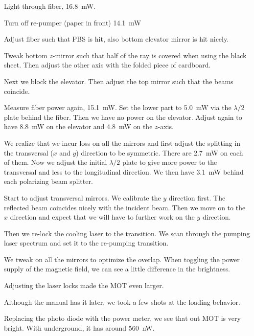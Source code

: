 \documentclass[11pt, english, fleqn, DIV=15, headinclude, BCOR=2cm]{scrreprt}
\begin{document}
Light through fiber, \SI{16.8}{\milli\watt}.

Turn off re-pumper (paper in front) \SI{14.1}{\milli\watt}

Adjust fiber such that PBS is hit, also bottom elevator mirror is hit nicely.

Tweak bottom $z$-mirror such that half of the ray is covered when using the
black sheet. Then adjust the other axis with the folded piece of cardboard.

Next we block the elevator. Then adjust the top mirror such that the beams
coincide.

Measure fiber power again, \SI{15.1}{\milli\watt}. Set the lower part to
\SI{5.0}{\milli\watt} via the $\lambda/2$ plate behind the fiber. Then we have
no power on the elevator. Adjust again to have \SI{8.8}{\milli\watt} on the
elevator and \SI{4.8}{\milli\watt} on the $z$-axis.

We realize that we incur loss on all the mirrors and first adjust the splitting
in the transversal ($x$ and $y$) direction to be symmetric. There are
\SI{2.7}{\milli\watt} on each of them. Now we adjust the initial $\lambda/2$
plate to give more power to the transversal and less to the longitudinal
direction. We then have \SI{3.1}{\milli\watt} behind each polarizing beam
splitter.

Start to adjust transversal mirrors. We calibrate the $y$ direction first. The
reflected beam coincides nicely with the incident beam. Then we move on to the
$x$ direction and expect that we will have to further work on the $y$
direction. 

Then we re-lock the cooling laser to the transition. We scan through the
pumping laser spectrum and set it to the re-pumping transition.

We tweak on all the mirrors to optimize the overlap. When toggling the power
supply of the magnetic field, we can see a little difference in the brightness.


Adjusting the laser locks made the MOT even larger.

Although the manual has it later, we took a few shots at the loading behavior.

Replacing the photo diode with the power meter, we see that out MOT is very
bright. With underground, it has around \SI{560}{\nano\watt}.

\end{document}
